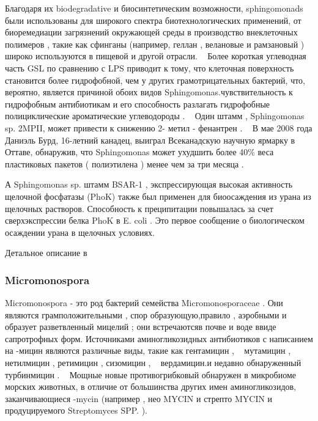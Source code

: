 \documentclass[11pt]{article}
\begin{document}
	Благодаря их biodegradative и биосинтетическим возможности, sphingomonads были использованы для широкого спектра биотехнологических применений, от биоремедиации загрязнений окружающей среды в производство внеклеточных полимеров , такие как сфинганы (например, геллан , велановые и рамзановый ) широко используются в пищевой и другой отрасли. ~\cite{Sphingomonas_7} Более короткая углеводная часть GSL по сравнению с LPS приводит к тому, что клеточная поверхность становится более гидрофобной, чем у других грамотрицательных бактерий, что, вероятно, является причиной обоих видов Sphingomonas.чувствительность к гидрофобным антибиотикам и его способность разлагать гидрофобные полициклические ароматические углеводороды . ~\cite{Sphingomonas_3} Один штамм , Sphingomonas sp. 2MPII, может привести к снижению 2- метил - фенантрен . ~\cite{Sphingomonas_8} В мае 2008 года Даниэль Бурд, 16-летний канадец, выиграл Всеканадскую научную ярмарку в Оттаве, обнаружив, что Sphingomonas может ухудшить более 40\% веса пластиковых пакетов ( полиэтилена ) менее чем за три месяца . ~\cite{Sphingomonas_9}
	
	А Sphingomonas sp. штамм BSAR-1 , экспрессирующая высокая активность щелочной фосфатазы (PhoK) также был применен для биоосаждения из урана из щелочных растворов. Способность к преципитации повышалась за счет сверхэкспрессии белка PhoK в E. coli . Это первое сообщение о биологическом осаждении урана в щелочных условиях. ~\cite{Sphingomonas_10}
	
	Детальное описание в ~\cite{Sphingomonas_1,Sphingomonas_2,Sphingomonas_3,Sphingomonas_4,Sphingomonas_5,Sphingomonas_6,Sphingomonas_7,Sphingomonas_8,Sphingomonas_9,Sphingomonas_10}
	
	\subsubsection{Micromonospora}
	Micromonospora - это род бактерий семейства Micromonosporaceae . Они являются грамположительными , спор образующую,правило , аэробными и образует разветвленный мицелий ; они встречаютсяв почве и воде ввиде сапротрофных форм. Источниками аминогликозидных антибиотиков с написанием на -мицин являются различные виды, такие как гентамицин , ~\cite{Micromonospora_1} мутамицин , ~\cite{Micromonospora_2} нетилмицин , ретимицин , сизомицин , ~\cite{Micromonospora_3} вердамицин.и недавно обнаруженный турбинмицин . ~\cite{Micromonospora_4} Мощные новые противогрибковый обнаружен в микробиоме морских животных, в отличие от большинства других имен аминогликозидов, заканчивающиеся -mycin (например , нео MYCIN и стрепто MYCIN и продуцируемого Streptomyces SPP. ).
	
\end{document}
